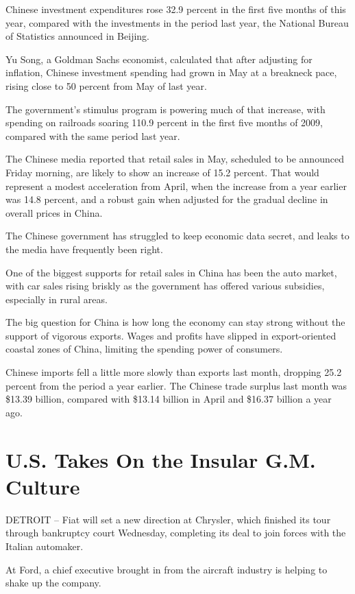 ﻿\documentclass[12pt,a4paper,onecolumn]{article}
\begin{document}
Chinese investment expenditures rose 32.9 percent in the first five months of this year, compared
with the investments in the period last year, the National Bureau of Statistics announced in
Beijing.

Yu Song, a Goldman Sachs economist, calculated that after adjusting for inflation, Chinese
investment spending had grown in May at a breakneck pace, rising close to 50 percent from May of
last year.

The government's stimulus program is powering much of that increase, with spending on railroads
soaring 110.9 percent in the first five months of 2009, compared with the same period last year.

The Chinese media reported that retail sales in May, scheduled to be announced Friday morning, are
likely to show an increase of 15.2 percent. That would represent a modest acceleration from April,
when the increase from a year earlier was 14.8 percent, and a robust gain when adjusted for the
gradual decline in overall prices in China.

The Chinese government has struggled to keep economic data secret, and leaks to the media have
frequently been right.

One of the biggest supports for retail sales in China has been the auto market, with car sales
rising briskly as the government has offered various subsidies, especially in rural areas.

The big question for China is how long the economy can stay strong without the support of vigorous
exports. Wages and profits have slipped in export-oriented coastal zones of China, limiting the
spending power of consumers.

Chinese imports fell a little more slowly than exports last month, dropping 25.2 percent from the
period a year earlier. The Chinese trade surplus last month was \$13.39 billion, compared with
\$13.14 billion in April and \$16.37 billion a year ago.

\section{U.S. Takes On the Insular G.M. Culture}

DETROIT -- Fiat will set a new direction at Chrysler, which finished its tour through bankruptcy
court Wednesday, completing its deal to join forces with the Italian automaker.

At Ford, a chief executive brought in from the aircraft industry is helping to shake up the company.
\end{document}
